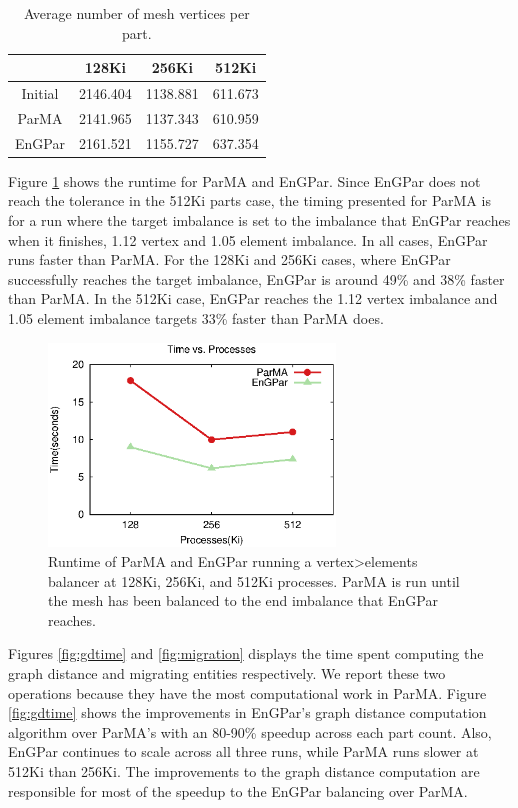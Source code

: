 \begin{table}[!h]
\centering
\begin{tabular}{||c|c|c|c||}
\hline
&128Ki&256Ki&512Ki \\
\hline
Initial & 2146.404 & 1138.881 & 611.673 \\
ParMA & 2141.965 & 1137.343 & 610.959 \\
EnGPar & 2161.521 &  1155.727 & 637.354 \\
\hline
\end{tabular}
\caption{Average number of mesh vertices per part.}
\label{tbl:avgvtx}
\end{table}

Figure \ref{fig:timegraph} shows the runtime for ParMA and EnGPar.
Since EnGPar does not reach the tolerance in the 512Ki parts case, the timing
presented for ParMA is for a run where the target
imbalance is set to the imbalance that EnGPar
reaches when it finishes, 1.12 vertex and 1.05
element imbalance. In all cases, EnGPar runs faster
than ParMA. For the 128Ki and 256Ki cases, where
EnGPar successfully reaches the target imbalance,
EnGPar is around 49\% and 38\% faster than ParMA.
In the 512Ki case, EnGPar reaches the 1.12 vertex
imbalance and 1.05 element imbalance targets 33\% faster than ParMA does.  

\begin{figure}[!ht]
  \centering
  \includegraphics[width=3in]{results/time_v_cores.eps}
  \caption{Runtime of ParMA and EnGPar running a vertex>elements balancer at 128Ki, 256Ki, and 512Ki processes. ParMA is run until the mesh has been balanced to the end imbalance that EnGPar reaches.}
  \label{fig:timegraph}
\end{figure}

Figures \ref{fig:gdtime}
and \ref{fig:migration} displays the time spent computing the
graph distance and migrating entities respectively. We report these two
operations because they have the most computational work in ParMA.
Figure \ref{fig:gdtime} shows the improvements in EnGPar's graph
distance computation algorithm over ParMA's with an 80-90\% speedup
across each part count. Also, EnGPar continues to scale across all
three runs, while ParMA runs slower at 512Ki than 256Ki. The
improvements to the graph distance computation are
responsible for most of the speedup to the EnGPar
balancing over ParMA.



